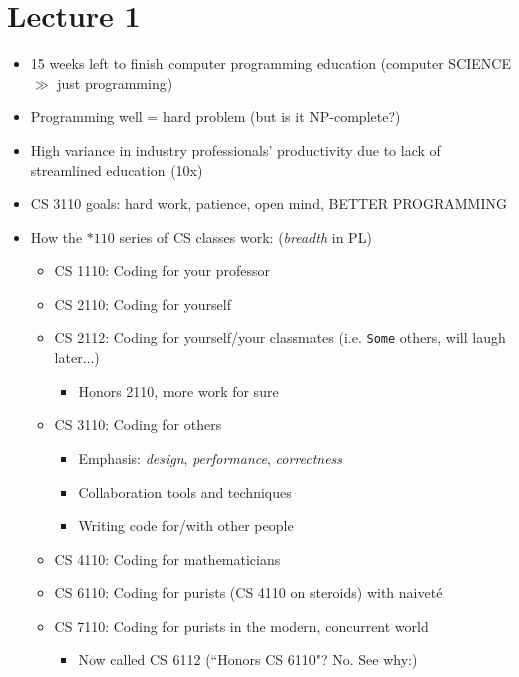 \section*{Lecture 1}

\begin{itemize}
    \item 15 weeks left to finish computer programming education (computer SCIENCE $\gg$ just programming)
    \item Programming \textit{}{well} = hard problem (but is it NP-complete?)
    \item High variance in industry professionals' productivity due to lack of streamlined education (10x)
    \item CS 3110 goals: hard work, patience, open mind, BETTER PROGRAMMING
    \item How the $*110$ series of CS classes work: (\textit{breadth} in PL)
    \begin{itemize}
        \item CS 1110: Coding for your professor
        \item CS 2110: Coding for yourself
        \item CS 2112: Coding for yourself/your classmates (i.e. \lstinline{Some} others, will laugh later$\ldots$)
        \begin{itemize}
            \item Honors 2110, more work for sure
        \end{itemize}
        \item CS 3110: Coding for others
        \begin{itemize}
            \item Emphasis: \textit{design}, \textit{performance}, \textit{correctness}
            \item Collaboration tools and techniques
            \item Writing code for/with other people
        \end{itemize}
        \item CS 4110: Coding for mathematicians
        \item CS 6110: Coding for purists (CS 4110 on steroids) with naivet\'{e}
        \item CS 7110: Coding for purists in the modern, concurrent world
        \begin{itemize}
            \item Now called CS 6112 (``Honors CS 6110"? No. See why:)
        \end{itemize}

\end{itemize}
\end{itemize}
